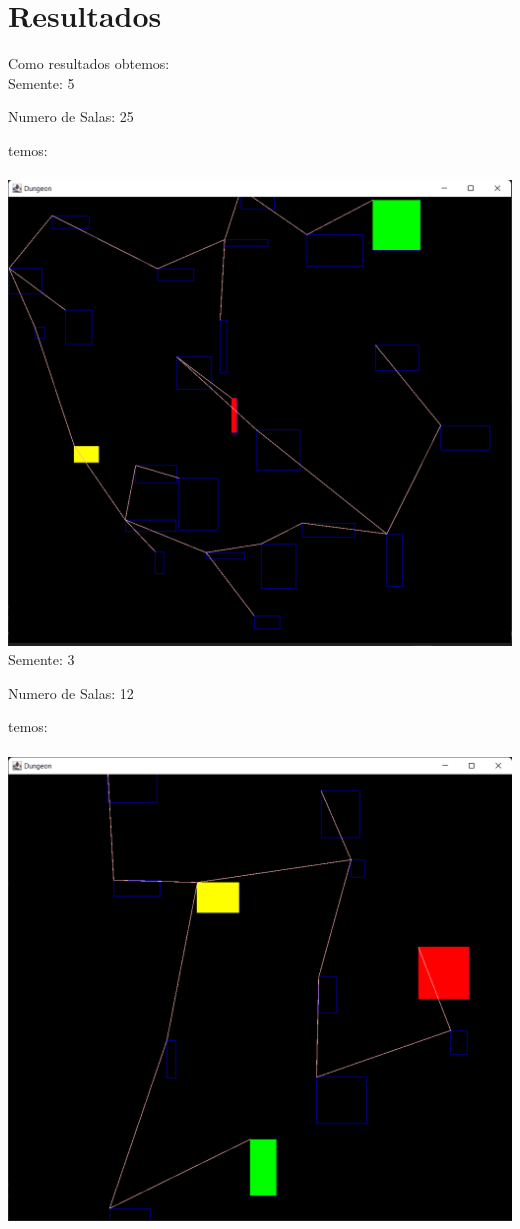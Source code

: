 \documentclass[a4paper, 12pt]{article}
\begin{document}
\newpage
\section{Resultados}
\graphicspath{ {./Results/} }
Como resultados obtemos:\\

Semente: 5

Numero de Salas: 25

temos:\\
\\
\includegraphics[width=\textwidth]{Grafo1.png}\\

Semente: 3

Numero de Salas: 12

temos:\\
\\
\includegraphics[width=\textwidth]{Grafo2.png}\\
\end{document}
